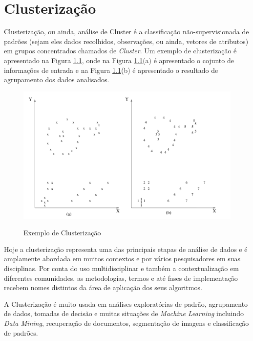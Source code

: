 \chapter{Clusterização}
\label{cap:CLUSTERIZACAO}

Clusterização, ou ainda, análise de Cluster é a classificação não-supervisionada de padrões (sejam eles dados recolhidos, observações, ou ainda, vetores de atributos) em grupos concentrados chamados de \textit{Cluster}. Um exemplo de clusterização é apresentado na Figura \ref{fig:DATA-CLUSTERING}\cite{Jain:1999:DCR:331499.331504}, onde na Figura \ref{fig:DATA-CLUSTERING}(a) é apresentado o cojunto de informações de entrada e na Figura \ref{fig:DATA-CLUSTERING}(b) é apresentado o resultado de agrupamento dos dados analisados.

\begin{figure}[!h]
\centering 
\caption{Exemplo de Clusterização}
\includegraphics[width = \textwidth]{imagens/dataclustering.png}
\label{fig:DATA-CLUSTERING}
\end{figure}


Hoje a clusterização representa uma das principais etapas de análise de dados e é amplamente abordada em muitos contextos e por vários pesquisadores em suas disciplinas. Por conta do uso multidisciplinar e também a contextualização em diferentes comunidades, as metodologias, termos e até fases de implementação recebem nomes distintos da área de aplicação dos seus algoritmos.

A Clusterização é muito usada em análises exploratórias de padrão, agrupamento de dados, tomadas de decisão e muitas situações de \textit{Machine Learning} incluindo \textit{Data Mining}, recuperação de documentos, segmentação de imagens e classificação de padrões.

